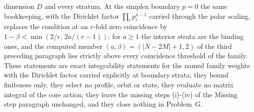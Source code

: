 dimension \(D\) and every stratum. At the simplex boundary \(p=0\) the same bookkeeping, with the Dirichlet factor \(\prod_{i}p_{i}^{a-1}\) carried through the polar scaling, replaces the condition at an \(r\)-fold zero coincidence by \(1-\beta<\min(2/r,\,2a/(r-1))\): for \(a\ge1\) the interior strata are the binding ones, and the computed member \((a,\beta)=(\lvert N-2M\rvert+1,2)\) of the third preceding paragraph lies strictly above every coincidence threshold of the family. These statements are exact integrability statements for the named family weights with the Dirichlet factor carried explicitly at boundary strata; they bound finiteness only, they select no profile, orbit or state, they evaluate no matrix integral of the core action, they leave the missing steps (i)-(iv) of the Missing step paragraph unchanged, and they close nothing in Problem~G.

